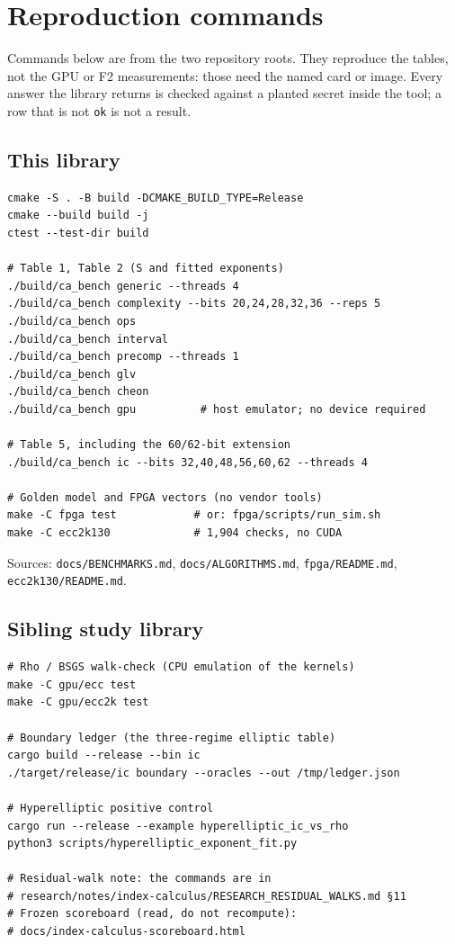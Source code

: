 \appendix
\section{Reproduction commands}
\label{app:repro}

Commands below are from the two repository roots. They reproduce the
tables, not the GPU or F2 measurements: those need the named card or
image. Every answer the library returns is checked against a planted
secret inside the tool; a row that is not \texttt{ok} is not a result.

\subsection{This library}

\begin{verbatim}
cmake -S . -B build -DCMAKE_BUILD_TYPE=Release
cmake --build build -j
ctest --test-dir build

# Table 1, Table 2 (S and fitted exponents)
./build/ca_bench generic --threads 4
./build/ca_bench complexity --bits 20,24,28,32,36 --reps 5
./build/ca_bench ops
./build/ca_bench interval
./build/ca_bench precomp --threads 1
./build/ca_bench glv
./build/ca_bench cheon
./build/ca_bench gpu          # host emulator; no device required

# Table 5, including the 60/62-bit extension
./build/ca_bench ic --bits 32,40,48,56,60,62 --threads 4

# Golden model and FPGA vectors (no vendor tools)
make -C fpga test            # or: fpga/scripts/run_sim.sh
make -C ecc2k130             # 1,904 checks, no CUDA
\end{verbatim}

\noindent Sources: \texttt{docs/BENCHMARKS.md},
\texttt{docs/ALGORITHMS.md}, \texttt{fpga/README.md},
\texttt{ecc2k130/README.md}.

\subsection{Sibling study library}

\begin{verbatim}
# Rho / BSGS walk-check (CPU emulation of the kernels)
make -C gpu/ecc test
make -C gpu/ecc2k test

# Boundary ledger (the three-regime elliptic table)
cargo build --release --bin ic
./target/release/ic boundary --oracles --out /tmp/ledger.json

# Hyperelliptic positive control
cargo run --release --example hyperelliptic_ic_vs_rho
python3 scripts/hyperelliptic_exponent_fit.py

# Residual-walk note: the commands are in
# research/notes/index-calculus/RESEARCH_RESIDUAL_WALKS.md §11
# Frozen scoreboard (read, do not recompute):
# docs/index-calculus-scoreboard.html
\end{verbatim}

